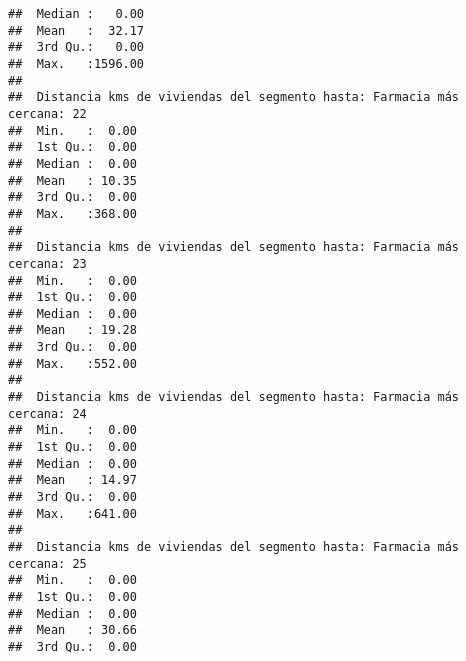 \documentclass[11pt,]{article}
\begin{document}
\begin{verbatim}
##  Median :   0.00                                                        
##  Mean   :  32.17                                                        
##  3rd Qu.:   0.00                                                        
##  Max.   :1596.00                                                        
##                                                                         
##  Distancia kms de viviendas del segmento hasta: Farmacia más cercana: 22
##  Min.   :  0.00                                                         
##  1st Qu.:  0.00                                                         
##  Median :  0.00                                                         
##  Mean   : 10.35                                                         
##  3rd Qu.:  0.00                                                         
##  Max.   :368.00                                                         
##                                                                         
##  Distancia kms de viviendas del segmento hasta: Farmacia más cercana: 23
##  Min.   :  0.00                                                         
##  1st Qu.:  0.00                                                         
##  Median :  0.00                                                         
##  Mean   : 19.28                                                         
##  3rd Qu.:  0.00                                                         
##  Max.   :552.00                                                         
##                                                                         
##  Distancia kms de viviendas del segmento hasta: Farmacia más cercana: 24
##  Min.   :  0.00                                                         
##  1st Qu.:  0.00                                                         
##  Median :  0.00                                                         
##  Mean   : 14.97                                                         
##  3rd Qu.:  0.00                                                         
##  Max.   :641.00                                                         
##                                                                         
##  Distancia kms de viviendas del segmento hasta: Farmacia más cercana: 25
##  Min.   :  0.00                                                         
##  1st Qu.:  0.00                                                         
##  Median :  0.00                                                         
##  Mean   : 30.66                                                         
##  3rd Qu.:  0.00                                                         

\end{verbatim}
\end{document}
